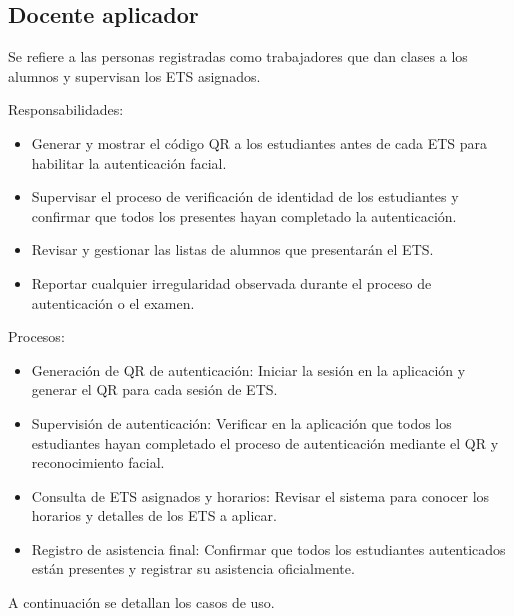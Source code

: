 \begin{Usuario}{\hypertarget{tDocenteAplicador}{\subsection{Docente aplicador}}}{
		Se refiere a las personas registradas como trabajadores que dan clases a los alumnos y supervisan los ETS asignados.
	}
	\item[Responsabilidades:] \cdtEmpty
	\begin{itemize}
		\item Generar y mostrar el código QR a los estudiantes antes de cada ETS para habilitar la autenticación facial.
		\item Supervisar el proceso de verificación de identidad de los estudiantes y confirmar que todos los presentes hayan completado la autenticación.
		\item Revisar y gestionar las listas de alumnos que presentarán el ETS.
		\item Reportar cualquier irregularidad observada durante el proceso de autenticación o el examen.
	\end{itemize}
	
	\item[Procesos:] \cdtEmpty
	\begin{itemize}
		\item Generación de QR de autenticación: Iniciar la sesión en la aplicación y generar el QR para cada sesión de ETS.
		\item Supervisión de autenticación: Verificar en la aplicación que todos los estudiantes hayan completado el proceso de autenticación mediante el QR y reconocimiento facial.
		\item Consulta de ETS asignados y horarios: Revisar el sistema para conocer los horarios y detalles de los ETS a aplicar.
		\item Registro de asistencia final: Confirmar que todos los estudiantes autenticados están presentes y registrar su asistencia oficialmente.
	\end{itemize}
\end{Usuario}



A continuación se detallan los casos de uso.



\newpage


\newpage


